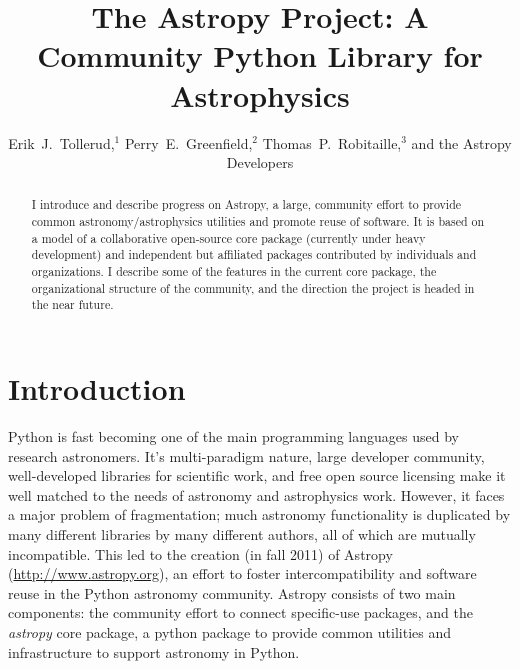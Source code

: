 

\resetcounters



\title{The Astropy Project: A Community Python Library for Astrophysics}
\author{Erik~J.~Tollerud,$^1$ Perry~E.~Greenfield,$^2$ Thomas~P.~Robitaille,$^3$ and the Astropy Developers
}


\begin{abstract}
I introduce and describe progress on Astropy, a large, community effort to provide common astronomy/astrophysics utilities and promote reuse of software. It is based on a model of a collaborative open-source core package (currently under heavy development) and independent but affiliated packages contributed by individuals and organizations. I  describe some of the features in the current core package, the organizational structure of the community, and the direction the project is headed in the near future.\end{abstract}

\section{Introduction}
Python is fast becoming one of the main programming languages used by research astronomers. It's multi-paradigm nature, large developer community, well-developed libraries for scientific work, and free open source licensing make it well matched to the needs of astronomy and astrophysics work. However, it faces a major problem of fragmentation; much astronomy functionality is duplicated by many different libraries by many different authors, all of which are mutually incompatible.  This led to the creation (in fall 2011) of Astropy (\url{http://www.astropy.org}), an effort to foster intercompatibility and software reuse in the Python astronomy community. Astropy consists of two main components: the  community effort to connect specific-use packages, and the {\it astropy} core package, a python package to provide common utilities and infrastructure to support astronomy in Python.

